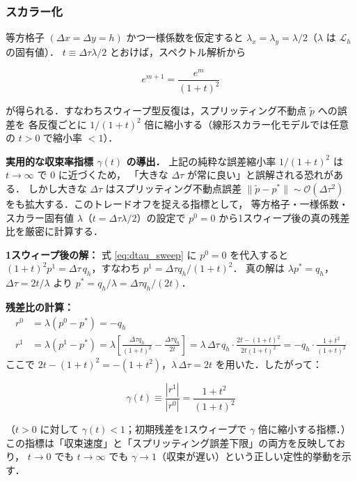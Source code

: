 \subsubsection*{スカラー化}

等方格子 $(\Delta x = \Delta y = h)$ かつ一様係数を仮定すると
$\lambda_x = \lambda_y = \lambda/2$（$\lambda$ は $\mathcal{L}_h$ の固有値）．
$t \equiv \Delta\tau\lambda/2$ とおけば，スペクトル解析から

\begin{equation}
  e^{m+1} = \frac{e^m}{(1+t)^2}
  \label{eq:error_contraction}
\end{equation}

が得られる．すなわちスウィープ型反復は，スプリッティング不動点 $\tilde{p}$ への誤差を
各反復ごとに $1/(1+t)^2$ 倍に縮小する（線形スカラー化モデルでは任意の $t > 0$ で縮小率 $< 1$）．

\medskip
\textbf{実用的な収束率指標 $\gamma(t)$ の導出．}
上記の純粋な誤差縮小率 $1/(1+t)^2$ は $t \to \infty$ で $0$ に近づくため，
「大きな $\Delta\tau$ が常に良い」と誤解される恐れがある．
しかし大きな $\Delta\tau$ はスプリッティング不動点誤差 $\|\tilde{p} - p^*\| \sim \mathcal{O}(\Delta\tau^2)$
をも拡大する．このトレードオフを捉える指標として，
等方格子・一様係数・スカラー固有値 $\lambda$（$t = \Delta\tau\lambda/2$）の設定で
$p^0 = 0$ から1スウィープ後の真の残差比を厳密に計算する．

\textbf{1スウィープ後の解：} 式 \eqref{eq:dtau_sweep} に $p^0 = 0$ を代入すると
$(1+t)^2 p^1 = \Delta\tau\,q_h$，すなわち $p^1 = \Delta\tau q_h/(1+t)^2$．
真の解は $\lambda p^* = q_h$，$\Delta\tau = 2t/\lambda$ より
$p^* = q_h/\lambda = \Delta\tau q_h/(2t)$．

\textbf{残差比の計算：}
\begin{align*}
  r^0 &= \lambda(p^0 - p^*) = -q_h \\
  r^1 &= \lambda(p^1 - p^*) = \lambda\!\left[\frac{\Delta\tau q_h}{(1+t)^2} - \frac{\Delta\tau q_h}{2t}\right]
       = \lambda\,\Delta\tau\,q_h \cdot \frac{2t - (1+t)^2}{2t(1+t)^2}
       = -q_h\cdot\frac{1+t^2}{(1+t)^2}
\end{align*}
ここで $2t-(1+t)^2 = -(1+t^2)$，$\lambda\,\Delta\tau = 2t$ を用いた．したがって：

\begin{equation}
  \gamma(t) \equiv \frac{|r^1|}{|r^0|} = \frac{1 + t^2}{(1+t)^2}
  \label{eq:gamma_t}
\end{equation}

（$t > 0$ に対して $\gamma(t) < 1$；初期残差を1スウィープで $\gamma$ 倍に縮小する指標．）
この指標は「収束速度」と「スプリッティング誤差下限」の両方を反映しており，
$t \to 0$ でも $t \to \infty$ でも $\gamma \to 1$（収束が遅い）という正しい定性的挙動を示す．

